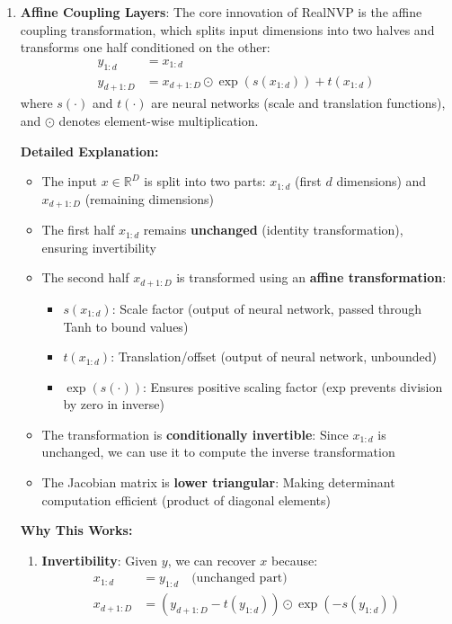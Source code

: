 \documentclass[conference,12pt]{IEEEtran}
\begin{document}
\begin{enumerate}
    \item \textbf{Affine Coupling Layers}: The core innovation of RealNVP is the affine coupling transformation, which splits input dimensions into two halves and transforms one half conditioned on the other:
    \begin{align}
        y_{1:d} &= x_{1:d} \\
        y_{d+1:D} &= x_{d+1:D} \odot \exp(s(x_{1:d})) + t(x_{1:d})
    \end{align}
    where $s(\cdot)$ and $t(\cdot)$ are neural networks (scale and translation functions), and $\odot$ denotes element-wise multiplication.
    
    \textbf{Detailed Explanation:}
    \begin{itemize}
        \item The input $x \in \mathbb{R}^D$ is split into two parts: $x_{1:d}$ (first $d$ dimensions) and $x_{d+1:D}$ (remaining dimensions)
        \item The first half $x_{1:d}$ remains \textbf{unchanged} (identity transformation), ensuring invertibility
        \item The second half $x_{d+1:D}$ is transformed using an \textbf{affine transformation}:
        \begin{itemize}
            \item $s(x_{1:d})$: Scale factor (output of neural network, passed through Tanh to bound values)
            \item $t(x_{1:d})$: Translation/offset (output of neural network, unbounded)
            \item $\exp(s(\cdot))$: Ensures positive scaling factor (exp prevents division by zero in inverse)
        \end{itemize}
        \item The transformation is \textbf{conditionally invertible}: Since $x_{1:d}$ is unchanged, we can use it to compute the inverse transformation
        \item The Jacobian matrix is \textbf{lower triangular}: Making determinant computation efficient (product of diagonal elements)
    \end{itemize}
    
    \textbf{Why This Works:}
    \begin{enumerate}
        \item \textbf{Invertibility}: Given $y$, we can recover $x$ because:
        \begin{align}
            x_{1:d} &= y_{1:d} \quad \text{(unchanged part)} \\
            x_{d+1:D} &= (y_{d+1:D} - t(y_{1:d})) \odot \exp(-s(y_{1:d}))
        \end{align}
        

\end{enumerate}
\end{enumerate}
\end{document}
